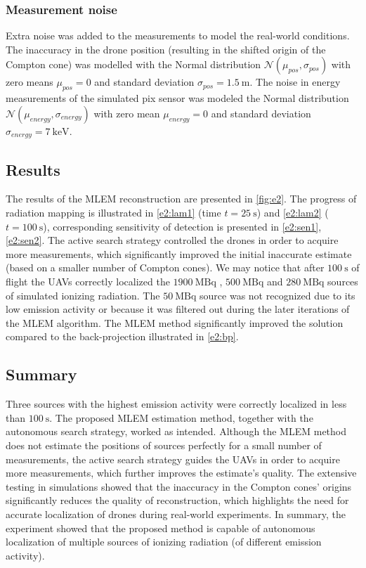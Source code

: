 \subsubsection{Measurement noise}
Extra noise was added to the measurements to model the real-world conditions.
The inaccuracy in the drone position (resulting in the shifted origin of the Compton cone) was modelled with the Normal distribution $\mathcal{N}(\mu_{pos}, \sigma_{pos})$ with zero means $\mu_{pos} = 0$ and standard deviation $\sigma_{pos} = \SI{1.5}{\meter}$. 
The noise in energy measurements of the simulated \ac{pix} sensor was modeled the Normal distribution $\mathcal{N}(\mu_{energy}, \sigma_{energy})$ with zero mean $\mu_{energy} = 0$ and standard deviation $\sigma_{energy} = \SI{7}{\kilo\electronvolt}$.

\subsection{Results}
The results of the \ac{MLEM} reconstruction are presented in \ref{fig:e2}.
The progress of radiation mapping is illustrated in \ref{e2:lam1} (time $t = \SI{25}{\second}$) and \ref{e2:lam2} ($t = \SI{100}{\second}$), corresponding sensitivity of detection is presented in \ref{e2:sen1}, \ref{e2:sen2}.
The active search strategy controlled the drones in order to acquire more measurements, which significantly improved the initial inaccurate estimate (based on a smaller number of Compton cones).
We may notice that after $\SI{100}{\second}$ of flight the \ac{UAV}s correctly localized the $\SI{1900}{\mega\becquerel}$ , $\SI{500}{\mega\becquerel}$ and $\SI{280}{\mega\becquerel}$ sources of simulated ionizing radiation.
The $\SI{50}{\mega\becquerel}$ source was not recognized due to its low emission activity or because it was filtered out during the later iterations of the \ac{MLEM} algorithm.
The \ac{MLEM} method significantly improved the solution compared to the back-projection illustrated in \ref{e2:bp}.

\subsection{Summary}
Three sources with the highest emission activity were correctly localized in less than $\SI{100}{\second}$.
The proposed \ac{MLEM} estimation method, together with the autonomous search strategy, worked as intended.
Although the \ac{MLEM} method does not estimate the positions of sources perfectly for a small number of measurements, the active search strategy guides the \ac{UAV}s in order to acquire more measurements, which further improves the estimate's quality.
The extensive testing in simulations showed that the inaccuracy in the Compton cones' origins significantly reduces the quality of reconstruction, which highlights the need for accurate localization of drones during real-world experiments.
In summary, the experiment showed that the proposed method is capable of autonomous localization of multiple sources of ionizing radiation (of different emission activity).




